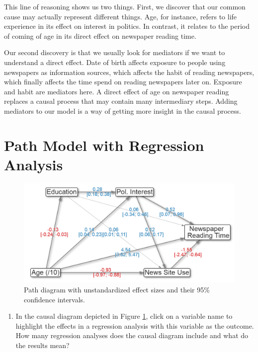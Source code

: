 \documentclass[a4paper]{book}
\providecommand{\tightlist}{%
  \setlength{\itemsep}{0pt}\setlength{\parskip}{0pt}}
\theoremstyle{definition}
\theoremstyle{definition}
\theoremstyle{definition}
\theoremstyle{remark}
\begin{document}
This line of reasoning shows us two things. First, we discover that our
common cause may actually represent different things. Age, for instance,
refers to life experience in its effect on interest in politics. In
contrast, it relates to the period of coming of age in its direct effect
on newspaper reading time.

Our second discovery is that we usually look for mediators if we want to
understand a direct effect. Date of birth affects exposure to people
using newspapers as information sources, which affects the habit of
reading newspapers, which finally affects the time spend on reading
newspapers later on. Exposure and habit are mediators here. A direct
effect of age on newspaper reading replaces a causal process that may
contain many intermediary steps. Adding mediators to our model is a way
of getting more insight in the causal process.

\section{Path Model with Regression
Analysis}\label{path-model-with-regression-analysis}

\begin{figure}[H]
\centering
\includegraphics{figures/mediation-regression.png}
\caption{\label{fig:mediation-regression}Path diagram with unstandardized
effect sizes and their 95\% confidence intervals.}
\end{figure}

\begin{enumerate}
\def\labelenumi{\arabic{enumi}.}
\tightlist
\item
  In the causal diagram depicted in Figure
  \ref{fig:mediation-regression}, click on a variable name to highlight
  the effects in a regression analysis with this variable as the
  outcome. How many regression analyses does the causal diagram include
  and what do the results mean?
\end{enumerate}
\end{document}

